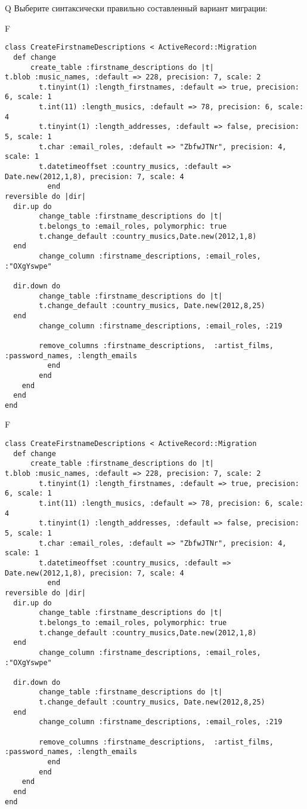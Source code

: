 Q
Выберите синтаксически правильно составленный вариант миграции:

F
\begin{verbatim}
class CreateFirstnameDescriptions < ActiveRecord::Migration
  def change
	  create_table :firstname_descriptions do |t|
t.blob :music_names, :default => 228, precision: 7, scale: 2
		t.tinyint(1) :length_firstnames, :default => true, precision: 6, scale: 1
		t.int(11) :length_musics, :default => 78, precision: 6, scale: 4
		t.tinyint(1) :length_addresses, :default => false, precision: 5, scale: 1
		t.char :email_roles, :default => "ZbfwJTNr", precision: 4, scale: 1
		t.datetimeoffset :country_musics, :default => Date.new(2012,1,8), precision: 7, scale: 4
		  end
reversible do |dir|
  dir.up do
		change_table :firstname_descriptions do |t|
		t.belongs_to :email_roles, polymorphic: true
 		t.change_default :country_musics,Date.new(2012,1,8)
  end
 		change_column :firstname_descriptions, :email_roles, :"OXgYswpe"
   
  dir.down do
		change_table :firstname_descriptions do |t|
		t.change_default :country_musics, Date.new(2012,8,25)
  end
 		change_column :firstname_descriptions, :email_roles, :219
   
		remove_columns :firstname_descriptions,  :artist_films, :password_names, :length_emails 
	      end
	    end
    end 
  end
end

\end{verbatim}

F
\begin{verbatim}
class CreateFirstnameDescriptions < ActiveRecord::Migration
  def change
	  create_table :firstname_descriptions do |t|
t.blob :music_names, :default => 228, precision: 7, scale: 2
		t.tinyint(1) :length_firstnames, :default => true, precision: 6, scale: 1
		t.int(11) :length_musics, :default => 78, precision: 6, scale: 4
		t.tinyint(1) :length_addresses, :default => false, precision: 5, scale: 1
		t.char :email_roles, :default => "ZbfwJTNr", precision: 4, scale: 1
		t.datetimeoffset :country_musics, :default => Date.new(2012,1,8), precision: 7, scale: 4
		  end
reversible do |dir|
  dir.up do
		change_table :firstname_descriptions do |t|
		t.belongs_to :email_roles, polymorphic: true
 		t.change_default :country_musics,Date.new(2012,1,8)
  end
 		change_column :firstname_descriptions, :email_roles, :"OXgYswpe"
   
  dir.down do
		change_table :firstname_descriptions do |t|
		t.change_default :country_musics, Date.new(2012,8,25)
  end
 		change_column :firstname_descriptions, :email_roles, :219
   
		remove_columns :firstname_descriptions,  :artist_films, :password_names, :length_emails 
	      end
	    end
    end 
  end
end

\end{verbatim}

